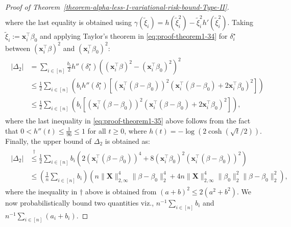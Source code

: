 \documentclass[10pt,a4paper]{amsart}
\begin{document}
\begin{proof}[Proof of Theorem~\ref{theorem-alpha-less-1-variational-risk-bound-Type-II}]
\begin{equation}
\begin{split}
    \end{split}
\end{equation}
where the last equality is obtained using $\gamma(\tilde{\xi}_i) = h(\tilde{\xi}_i^2) - \tilde{\xi}_i^2h'(\tilde{\xi}_i^2)$. Taking $\tilde{\xi}_i := \mathbf{x}_i^{\top}\beta_0$ and applying Taylor's theorem in \eqref{eq:proof-theorem1-34} for $\delta_i^{\star}$ between $(\mathbf{x}_i^{\top}\beta)^2$ and $(\mathbf{x}_i^{\top}\beta_0)^2$:
\begin{align}\label{eq:proof-theorem1-35}
    \begin{split}
        |\Delta_2| &= \sum_{i\in [n]}\frac{b_i}{2}h''(\delta_i^{\star})\left((\mathbf{x}_i^{\top}\beta)^2 - (\mathbf{x}_i^{\top}\beta_0)^2\right)^2\\
        &\leq \frac{1}{2}\sum_{i\in [n]}\left(b_i h''(\delta_i^{\star})\left[\left(\mathbf{x}_i^{\top}(\beta-\beta_0)\right)^2\left(\mathbf{x}_i^{\top}(\beta-\beta_0) + 2\mathbf{x}_i^{\top}\beta_0\right)^2\right]\right)\\
        &\leq \frac{1}{2}\sum_{i\in [n]}\left(b_i\left[\left(\mathbf{x}_i^{\top}(\beta-\beta_0)\right)^2\left(\mathbf{x}_i^{\top}(\beta-\beta_0) + 2\mathbf{x}_i^{\top}\beta_0\right)^2\right]\right),
    \end{split}
\end{align}
where the last inequality in \eqref{eq:proof-theorem1-35} above follows from the fact that $0<h''(t)\leq \frac{1}{96} \leq 1$ for all $t\geq 0$, where $h(t) = -\log (2\cosh(\sqrt{t}/2))$. Finally, the upper bound of $\Delta_2$ is obtained as:
\begin{align}\label{eq:proof-theorem1-36}
    \begin{split}
        |\Delta_2| &\stackrel{\dagger}{\leq} \frac{1}{2}\sum_{i\in [n]}b_i\left(2\left(\mathbf{x}_i^{\top}(\beta-\beta_0)\right)^4 + 8(\mathbf{x}_i^{\top}\beta_0)^2\left(\mathbf{x}_i^{\top}(\beta-\beta_0)\right)^2\right)\\
        &\leq\left(\frac{1}{n}\sum_{i\in [n]}b_i\right)\left(n\lVert \mathbf{X}\rVert_{2, \infty}^{4}\lVert \beta-\beta_0\rVert_{2}^{4} + 4n\lVert \mathbf{X}\rVert_{2, \infty}^{4}\lVert \beta_0\rVert_{2}^{2}\lVert \beta-\beta_0\rVert_{2}^{2}\right),
    \end{split}
\end{align}
where the inequality in $\dagger$ above is obtained from $(a+b)^2\leq 2(a^2+b^2)$. We now probabilistically bound two quantities viz., $n^{-1}\sum_{i\in [n]}b_i$ and $n^{-1}\sum_{i\in [n]}(a_i+b_i)$.


\end{proof}
\end{document}

